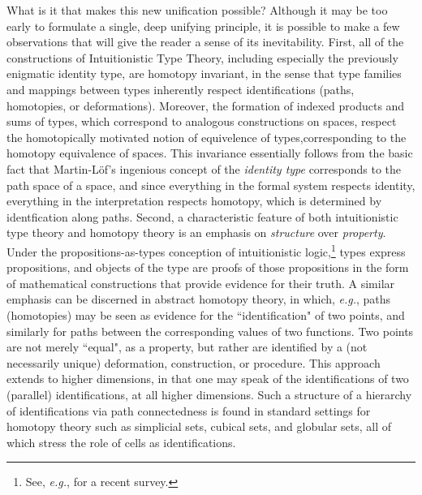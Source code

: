 \documentclass[11pt]{article}
\theoremstyle{remark}
\theoremstyle{definition}
\begin{document}
What is it that makes this new unification possible?  Although it may be too early to formulate a single, deep unifying
principle, it is possible to make a few observations that will give the reader a sense of its inevitability.  
First, all of the constructions of Intuitionistic Type Theory, including especially the previously enigmatic identity type, are
homotopy invariant, in the sense that type families and mappings between types inherently respect identifications
(paths, homotopies, or deformations).  Moreover, the formation of indexed products and sums of types, which correspond to analogous constructions on spaces, respect the homotopically motivated notion of equivelence of types,corresponding to the homotopy equivalence of spaces.  This invariance essentially follows from the basic fact that Martin-L\"{o}f's ingenious concept of the \emph{identity type} corresponds to the path space of a space, and since everything in the formal system respects identity, everything in the interpretation respects homotopy, which is determined by identfication along paths.
Second, a characteristic feature of both intuitionistic type theory and homotopy
theory is an emphasis on \emph{structure} over \emph{property}.  Under the propositions-as-types conception of
intuitionistic logic,\footnote{See, \textit{e.g.}, \cite{PAT} for a recent survey.} types express propositions, and objects of
the type are proofs of those propositions in the form of mathematical constructions that provide evidence for their
truth.  A similar emphasis can be discerned in abstract homotopy theory, in which, \textit{e.g.}, paths (homotopies) may be seen
as evidence for the ``identification" of two points, and similarly for paths between the corresponding values of two
functions.  Two points are not merely ``equal", as a property, but rather are identified by a (not necessarily unique)
deformation, construction, or procedure.  This approach extends to higher dimensions, in that one may speak of the
identifications of two (parallel) identifications, at all higher dimensions.  Such a structure of a hierarchy of
identifications via path connectedness is found in standard settings for homotopy theory such as simplicial sets,
cubical sets, and globular sets, all of which stress the role of cells as identifications.
\end{document}
